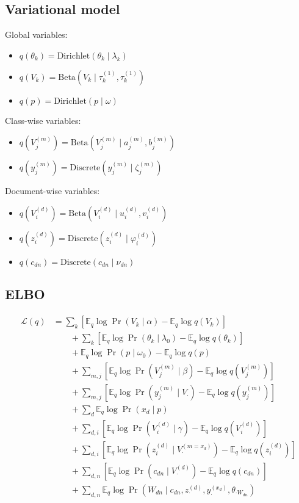 \documentclass{article}
\newcommand{\Beta}{\ensuremath{\mathrm{Beta}}}
\newcommand{\Dirichlet}{\ensuremath{\mathrm{Dirichlet}}}
\newcommand{\Discrete}{\ensuremath{\mathrm{Discrete}}}
\newcommand{\Eq}{\ensuremath{\mathbb{E}_q\xspace}}
\newcommand{\Lq}{\ensuremath{\mathcal{L}(q)}}
\begin{document}
\subsection*{Variational model}

Global variables:
\begin{itemize}
\item $\displaystyle q(\theta_k) = \Dirichlet(\theta_k \mid \lambda_k)$
\item $\displaystyle q(V_k) = \Beta(V_k \mid \tau_k^{(1)}, \tau_k^{(1)})$
\item $q(p) = \Dirichlet(p \mid \omega)$
\end{itemize}
Class-wise variables:
\begin{itemize}
\item $\displaystyle q(V_j^{(m)}) = \Beta(V_j^{(m)} \mid a_j^{(m)}, b_j^{(m)})$
\item $q(y_j^{(m)}) = \Discrete(y_j^{(m)} \mid \zeta_j^{(m)})$
\end{itemize}
Document-wise variables:
\begin{itemize}
\item $\displaystyle q(V_i^{(d)}) = \Beta(V_i^{(d)} \mid u_i^{(d)}, v_i^{(d)})$
\item $q(z_i^{(d)}) = \Discrete(z_i^{(d)} \mid \varphi_i^{(d)})$
\item $\displaystyle q(c_{dn}) = \Discrete(c_{dn} \mid \nu_{dn})$
\end{itemize}


\subsection*{ELBO}

\begin{align*}
\Lq
    &= \sum_k \left[ \Eq \log \Pr(V_k \mid \alpha) - \Eq \log q(V_k) \right] \\
    &\qquad + \sum_k \left[ \Eq \log \Pr(\theta_k \mid \lambda_0) - \Eq \log q(\theta_k) \right] \\
    &\qquad + \Eq \log \Pr(p \mid \omega_0) - \Eq \log q(p) \\
    &\qquad + \sum_{m,j} \left[ \Eq \log \Pr(V_j^{(m)} \mid \beta) - \Eq \log q(V_j^{(m)}) \right] \\
    &\qquad + \sum_{m,j} \left[ \Eq \log \Pr(y_j^{(m)} \mid V_\cdot) - \Eq \log q(y_j^{(m)}) \right] \\
    &\qquad + \sum_d \Eq \log \Pr(x_d \mid p) \\
    &\qquad + \sum_{d,i} \left[ \Eq \log \Pr(V_i^{(d)} \mid \gamma) - \Eq \log q(V_i^{(d)}) \right] \\
    &\qquad + \sum_{d,i} \left[ \Eq \log \Pr(z_i^{(d)} \mid V^{(m=x_d)}_\cdot) - \Eq \log q(z_i^{(d)}) \right] \\
    &\qquad + \sum_{d,n} \left[ \Eq \log \Pr(c_{dn} \mid V^{(d)}_\cdot) - \Eq \log q(c_{dn}) \right] \\
    &\qquad + \sum_{d,n} \Eq \log \Pr(W_{dn} \mid c_{dn}, z_\cdot^{(d)}, y_\cdot^{(x_d)}, \theta_{\cdot W_{dn}})
\end{align*}
\end{document}
